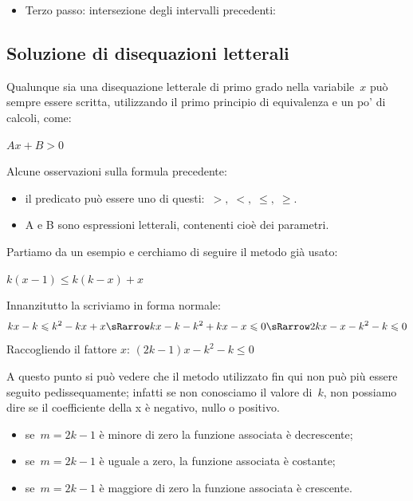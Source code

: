 \begin{esempio}{}{}
\begin{itemize} [left=0mm]
\item Terzo passo: intersezione degli intervalli precedenti:\\
\vspace{-8mm}\hspace*{-5mm}
{\sistemab}
\vspace{3mm}
\end{itemize}
\end{esempio}

\subsection{Soluzione di disequazioni letterali}
\label{sec:dis_tetterali}

Qualunque sia una disequazione letterale di primo grado nella 
variabile~\(x\) può sempre essere scritta, utilizzando il primo 
principio di equivalenza e un po' di calcoli, come:

\(A x + B > 0\)

Alcune osservazioni sulla formula precedente:

\begin{itemize} [noitemsep]
 \item il predicato può essere uno di questi:~\(>, \; <, \; \le, \; \ge\).
 \item A e B sono espressioni letterali, contenenti cioè dei parametri.
\end{itemize}

Partiamo da un  esempio e cerchiamo di seguire il metodo già usato:

\(k \left( x -1 \right )\leqslant k \left ( k - x \right ) + x\)

Innanzitutto la scriviamo in forma normale:
\[k x - k \leqslant k^2 - k x + x \sRarrow k x - k - k^2 + k x - x \leqslant0 
\sRarrow
2 k x - x - k^2 - k \leqslant 0\]
Raccogliendo il fattore \(x\): \quad 
\(\left (2 k - 1 \right ) x - k^2 - k \leqslant 0\)

A questo punto si può vedere che il metodo utilizzato fin qui non può più 
essere seguito pedissequamente; infatti se non conosciamo il valore 
di~\(k\), non possiamo dire se il coefficiente della x è negativo, nullo 
o positivo.

\begin{itemize} [noitemsep]
\item se~\(m = 2k -1\) è minore di zero la funzione associata è 
decrescente;
\item se~\(m = 2k -1\) è uguale a zero, la funzione associata è costante;
\item se~\(m = 2k -1\) è maggiore di zero la funzione associata è 
crescente.
\end{itemize}

